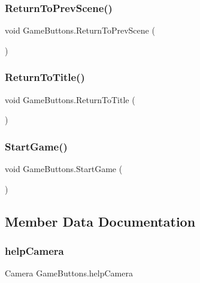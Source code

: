 \subsubsection{\texorpdfstring{Return\+To\+Prev\+Scene()}{ReturnToPrevScene()}}
{\footnotesize\ttfamily void Game\+Buttons.\+Return\+To\+Prev\+Scene (\begin{DoxyParamCaption}{ }\end{DoxyParamCaption})}

\mbox{\label{class_game_buttons_aa24ecd9e57ec9e74b94d2e974655c630}} 
\subsubsection{\texorpdfstring{Return\+To\+Title()}{ReturnToTitle()}}
{\footnotesize\ttfamily void Game\+Buttons.\+Return\+To\+Title (\begin{DoxyParamCaption}{ }\end{DoxyParamCaption})}

\mbox{\label{class_game_buttons_acfb2c2af597071c65abe2535199bf5d9}} 
\subsubsection{\texorpdfstring{Start\+Game()}{StartGame()}}
{\footnotesize\ttfamily void Game\+Buttons.\+Start\+Game (\begin{DoxyParamCaption}{ }\end{DoxyParamCaption})}



\subsection{Member Data Documentation}
\mbox{\label{class_game_buttons_a2209c4c549e16c9c815b1c0a3a15bbbd}} 
\subsubsection{\texorpdfstring{help\+Camera}{helpCamera}}
{\footnotesize\ttfamily Camera Game\+Buttons.\+help\+Camera}

